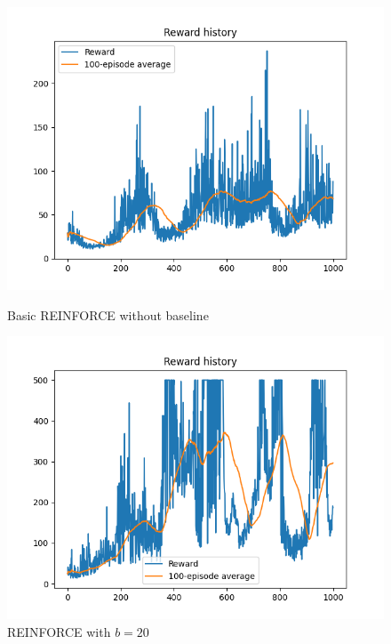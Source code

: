 \documentclass[12pt]{article}
\begin{document}
\begin{figure}[ht]
    \centering
   \begin{minipage}{0.33\textwidth}
     \centering
     \includegraphics[width=0.9\linewidth]{exercise-5/plots/task-1a.png}
     \caption{Basic REINFORCE without baseline}
     \label{fig:task-2-1}
   \end{minipage}\hfill
   \begin{minipage}{0.33\textwidth}
     \centering
     \includegraphics[width=0.9\linewidth]{exercise-5/plots/task-1b.png}
     \caption{REINFORCE with $b=20$}
     \label{fig:task-2-1}
   \end{minipage}\hfill
   \begin{minipage}{0.33\textwidth}
     \centering

\end{minipage}
\end{figure}
\end{document}
